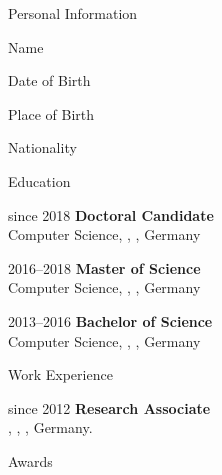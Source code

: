 
\label{ch:CurriculumVitae}


\glsresetall %

\begin{cv}{}

\renewcommand*{\cvlistheadingfont}{\spacedlowsmallcaps} %
\renewcommand*{\cvlabelfont}{\itshape}
\setlength\cvlabelwidth{60pt}

\begin{cvlist}{{Personal Information}}
    \item[Name] \myName
    \item[Date of Birth] 
    \item[Place of Birth] \myBirthPlace
    \item[Nationality] \myNationality
\end{cvlist}


\begin{cvlist}{{Education}}

\item[since 2018] \textbf{Doctoral Candidate} \\
Computer Science, \myUni, \myLocation, Germany

\item[2016--2018] \textbf{Master of Science} \\
Computer Science, \myUni, \myLocation, Germany

\item[2013--2016] \textbf{Bachelor of Science} \\
Computer Science, \myUni, \myLocation, Germany

\end{cvlist}


\begin{cvlist}{{Work Experience}}

\item[since 2012] \textbf{Research Associate} \\
\myDepartment, \myUni, \myLocation, Germany.

\end{cvlist}


\begin{cvlist}{{Awards}}


\end{cvlist}
\end{cv}
